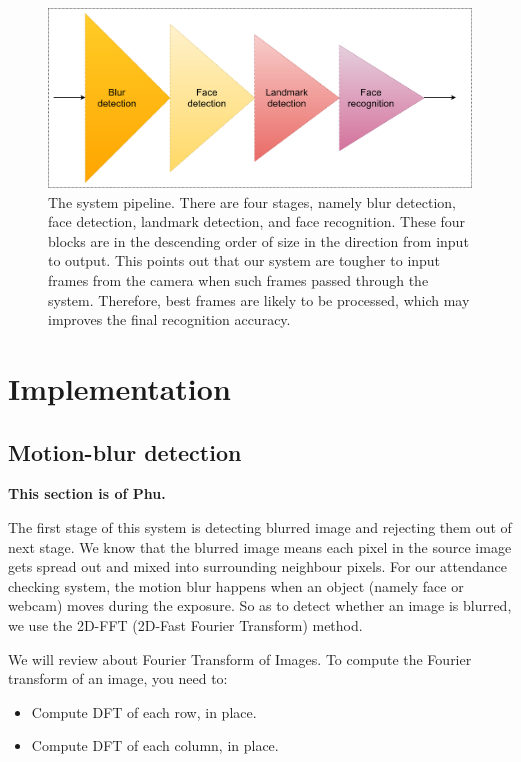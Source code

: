 \documentclass[journal, twocolumn]{IEEEtran}
\begin{document}
\begin{figure}
    \centering
    \includegraphics[width=\linewidth]{img/system-pipeline.png}
	\caption{The system pipeline. There are four stages, namely blur detection, face detection, landmark detection, and face recognition. These four blocks are in the descending order of size in the direction from input to output. This points out that our system are tougher to input frames from the camera when such frames passed through the system. Therefore, best frames are likely to be processed, which may improves the final recognition accuracy.}\label{fig:system}
\end{figure}


\medskip
\section{Implementation}
\label{implementation}

\subsection{Motion-blur detection}
\label{motion-blur-detection}
\textbf{This section is of Phu.}

The first stage of this system is detecting blurred image and rejecting them out of next stage. We know that the blurred image means each pixel in the source image gets spread out and mixed into surrounding neighbour pixels. For our attendance checking system, the motion blur happens when an object (namely face or webcam) moves during the exposure. So as to detect whether an image is blurred, we use the 2D-FFT (2D-Fast Fourier Transform) method.

 We will review about Fourier Transform of Images. To compute the Fourier transform of an image, you need to:
\begin{itemize}
\item Compute DFT of each row, in place.
\item Compute DFT of each column, in place.
\end{itemize}  
\end{document}

